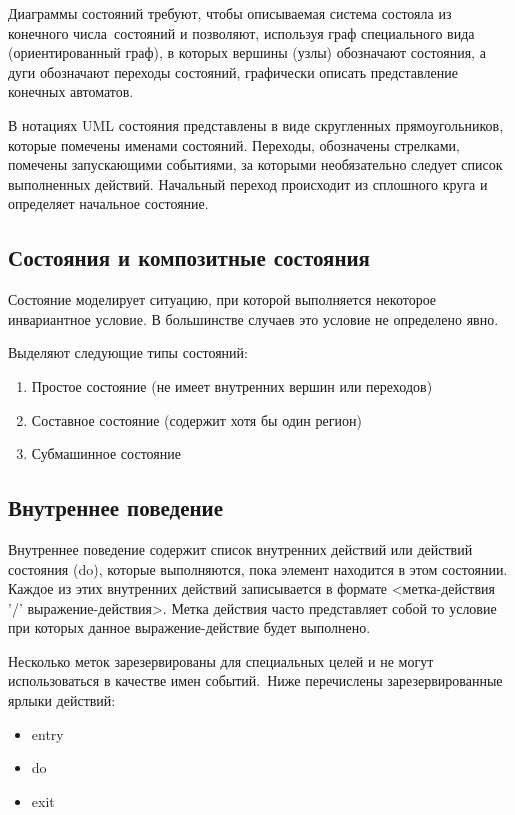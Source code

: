 Диаграммы состояний требуют, чтобы описываемая система состояла из конечного числа состояний и позволяют, используя граф специального вида (ориентированный граф), в которых вершины (узлы) обозначают состояния, а дуги обозначают переходы состояний, графически описать представление конечных автоматов. 

В нотациях UML состояния представлены в виде скругленных прямоугольников, которые помечены именами состояний. Переходы, обозначены стрелками, помечены запускающими событиями, за которыми необязательно следует список выполненных действий. Начальный переход происходит из сплошного круга и определяет начальное состояние.

\subsection{Состояния и композитные состояния}

Состояние моделирует ситуацию, при которой выполняется некоторое инвариантное условие. В большинстве случаев это условие не определено явно.

Выделяют следующие типы состояний:

\begin{enumerate}
	\item{Простое состояние (не имеет внутренних вершин или переходов)}
	\item{Составное состояние (содержит хотя бы один регион)}
	\item{Субмашинное состояние}
\end{enumerate}

\subsection{Внутреннее поведение}

Внутреннее поведение содержит список внутренних действий или действий состояния (do), которые выполняются, пока элемент находится в этом состоянии. Каждое из этих внутренних действий записывается в формате <метка-действия '/' выражение-действия>. Метка действия часто представляет собой то условие при которых данное выражение-действие будет выполнено.

Несколько меток зарезервированы для специальных целей и не могут использоваться в качестве имен событий. Ниже перечислены зарезервированные ярлыки действий:

\begin{itemize}
	\item{entry}
	\item{do}
	\item{exit}
\end{itemize}

